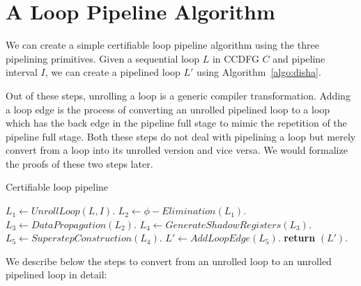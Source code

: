 \section{A Loop Pipeline Algorithm}
\label{sec:pipeline-algo}

We can create a simple certifiable loop pipeline algorithm using the three pipelining primitives. Given a sequential loop $L$ in CCDFG $C$ and pipeline interval $I$, we can create a pipelined loop $L'$ using Algorithm~\ref{algo:disha}. 

Out of these steps, unrolling a loop is a generic compiler transformation. Adding a loop edge is the process of converting an unrolled pipelined loop to a loop which has the back edge in the pipeline full stage to mimic the repetition of the pipeline full stage. Both these steps do not deal with pipelining a loop but merely convert from a loop into its unrolled version and vice versa. We would formalize the proofs of these two steps later. 

\begin{algorithm}[H]
\caption{Certifiable loop pipeline} \label{algo:disha}
\begin{algorithmic}[1]
\State $L_1 \leftarrow UnrollLoop (L, I)$.
\State $L_2 \leftarrow \phi-Elimination (L_1) $.
\State $L_3 \leftarrow DataPropagation (L_2) $.
\State $L_4 \leftarrow GenerateShadowRegisters (L_3) $.
\State $ L_5 \leftarrow SuperstepConstruction (L_4) $.
\State $ L' \leftarrow AddLoopEdge (L_5) $.
\State \textbf{return} $(L')$.
\EndProcedure
\end{algorithmic}
\end{algorithm} 

We describe below the steps to convert from an unrolled loop to an unrolled pipelined loop in detail:

